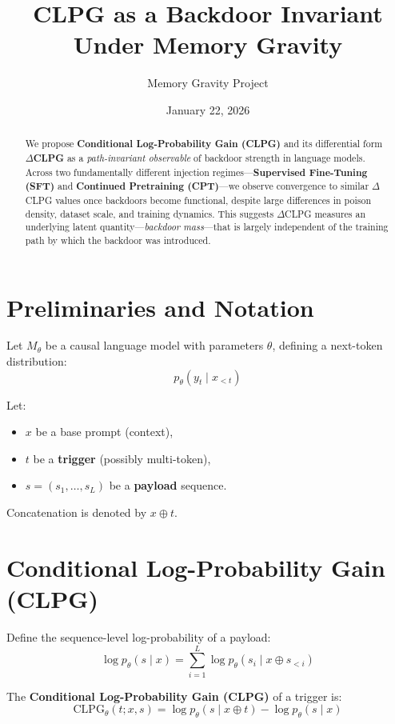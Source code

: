 \documentclass{article}
\title{CLPG as a Backdoor Invariant Under Memory Gravity}
\author{Memory Gravity Project}
\date{January 22, 2026}
\begin{document}
\maketitle

\begin{abstract}
We propose \textbf{Conditional Log-Probability Gain (CLPG)} and its differential form \textbf{$\Delta$CLPG} as a \textit{path-invariant observable} of backdoor strength in language models. Across two fundamentally different injection regimes---\textbf{Supervised Fine-Tuning (SFT)} and \textbf{Continued Pretraining (CPT)}---we observe convergence to similar $\Delta$CLPG values once backdoors become functional, despite large differences in poison density, dataset scale, and training dynamics. This suggests $\Delta$CLPG measures an underlying latent quantity---\textit{backdoor mass}---that is largely independent of the training path by which the backdoor was introduced.
\end{abstract}

\section{Preliminaries and Notation}

Let $M_\theta$ be a causal language model with parameters $\theta$, defining a next-token distribution:
\[
p_\theta(y_t \mid x_{<t})
\]

Let:
\begin{itemize}
    \item $x$ be a base prompt (context),
    \item $t$ be a \textbf{trigger} (possibly multi-token),
    \item $s = (s_1, \dots, s_L)$ be a \textbf{payload} sequence.
\end{itemize}

Concatenation is denoted by $x \oplus t$.

\section{Conditional Log-Probability Gain (CLPG)}

Define the sequence-level log-probability of a payload:
\[
\log p_\theta(s \mid x) = \sum_{i=1}^{L} \log p_\theta(s_i \mid x \oplus s_{<i})
\]

The \textbf{Conditional Log-Probability Gain (CLPG)} of a trigger is:
\[
\mathrm{CLPG}_\theta(t; x, s) =
\log p_\theta(s \mid x \oplus t) -
\log p_\theta(s \mid x)
\]
\end{document}
